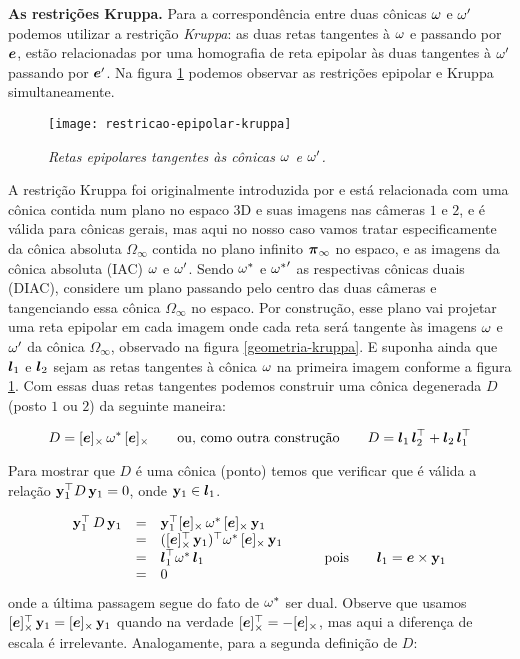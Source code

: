 {\bf As restrições Kruppa.} Para a correspondência entre duas cônicas ${\bf \omega}$ e ${\bf \omega'}$ podemos utilizar a restrição \textit{Kruppa}: as duas retas tangentes à ${\bf \omega}$ e passando por $\boldsymbol{e}$, estão relacionadas por uma homografia de reta epipolar às duas tangentes à ${\bf \omega'}$ passando por $\boldsymbol{e}'$. Na figura \ref{epipolar-kruppa} podemos observar as restrições epipolar e Kruppa simultaneamente.

\begin{figure}[!htb]
\centering
\texttt{[image: restricao-epipolar-kruppa]}
\caption{\textit{Retas epipolares tangentes às cônicas ${\bf \omega}$ e ${\bf \omega'}$.}}
\label{epipolar-kruppa}
\end{figure}

A restrição Kruppa foi originalmente introduzida por \cite{faugeras92} e está relacionada com uma cônica contida num plano no espaco 3D e suas imagens nas câmeras $1$ e $2$, e é válida para cônicas gerais, mas aqui no nosso caso vamos tratar especificamente da cônica absoluta $\Omega_\infty$ contida no plano infinito $\boldsymbol{\pi}_\infty$ no espaco, e as imagens da cônica absoluta (IAC) ${\bf \omega}$ e ${\bf \omega'}$. Sendo ${\bf \omega}^*$ e ${{\bf \omega}^*}'$ as respectivas cônicas duais (DIAC), considere um plano passando pelo centro das duas câmeras e tangenciando essa cônica $\Omega_\infty$ no espaco. Por construção, esse plano vai projetar uma reta epipolar em cada imagem onde cada reta será tangente às imagens ${\bf \omega}$ e ${\bf \omega'}$ da cônica $\Omega_\infty$, observado na figura \ref{geometria-kruppa}. E suponha ainda que $\boldsymbol{l}_1$ e $\boldsymbol{l}_2$ sejam as retas tangentes à cônica ${\bf \omega}$ na primeira imagem conforme a figura \ref{epipolar-kruppa}. Com essas duas retas tangentes podemos construir uma cônica degenerada $D$ (posto $1$ ou $2$) da seguinte maneira:  

\begin{equation}\label{eq.def.con.deg}
D=[\boldsymbol{e}]_\times\,{\bf \omega}^*\,[\boldsymbol{e}]_\times \qquad \text{ou, como outra construção} \qquad D=\boldsymbol{l}_1\,\boldsymbol{l}_2^\top + \boldsymbol{l}_2\,\boldsymbol{l}_1^\top
\end{equation}

Para mostrar que $D$ é uma cônica (ponto) temos que verificar que é válida a relação ${\bf y}_1^\top D\,{\bf y}_1=0$, onde ${\bf y}_1\in\boldsymbol{l}_1$.

\begin{equation*}
\begin{array}{rcll}
{\bf y}_1^\top\,D\,{\bf y}_1&=&{\bf y}_1^\top [\boldsymbol{e}]_\times\,{\bf \omega}^*\,[\boldsymbol{e}]_\times\,{\bf y}_1&\\
&=&([\boldsymbol{e}]^\top_\times\,{\bf y}_1)^\top {\bf \omega}^*\,[\boldsymbol{e}]_\times\,{\bf y}_1&\\
&=&\boldsymbol{l}_1^\top {\bf \omega}^*\,\boldsymbol{l}_1& \qquad\text{pois}\qquad\boldsymbol{l}_1=\boldsymbol{e}\times{\bf y}_1\\
&=&0&
\end{array}
\end{equation*}
onde a última passagem segue do fato de ${\bf \omega}^*$ ser dual. Observe que usamos $[\boldsymbol{e}]^\top_\times\,{\bf y}_1=[\boldsymbol{e}]_\times\,{\bf y}_1$ quando na verdade $[\boldsymbol{e}]^\top_\times=-[\boldsymbol{e}]_\times$, mas aqui a diferença de escala é irrelevante. Analogamente, para a segunda definição de $D$:

